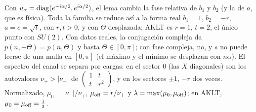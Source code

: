 \documentclass[11pt,a4paper]{article}
\theoremstyle{remark}
\begin{document}
Con $u_\alpha={\rm diag}(e^{-i\alpha/2},e^{i\alpha/2})$, el lema cambia la fase relativa de
$b_1$ y $b_2$ (y la de $a$, que es física). Toda la familia se reduce así a la forma real
$b_1=1$, $b_2=-r$, $a=c=\sqrt t$, con $r,t>0$, y con $\Theta$ desplazada; AKLT es $r=1$, $t=2$, el
único punto con $SU(2)$. Con datos reales, la conjugación compleja da $p(n,-\Theta)=p(n,\Theta)$ y
basta $\Theta\in[0,\pi]$; con fase compleja, no, y $s$ no puede leerse de una malla en $[0,\pi]$
(el máximo y el mínimo se desplazan con $n\alpha$). El espectro del canal se separa por cargas:
en el sector $0$ (las $X$ diagonales) son los autovalores $\nu_+>|\nu_-|$ de
$\left(\begin{smallmatrix}1&t\\t&r^2\end{smallmatrix}\right)$, y en los sectores $\pm1$, $-r$
dos veces. Normalizado, $\mu_0=|\nu_-|/\nu_+$, $\mu_{\rm off}=r/\nu_+$ y
$\lambda=\max(\mu_0,\mu_{\rm off})$; en AKLT, $\mu_0=\mu_{\rm off}=\tfrac13$.
\end{document}
